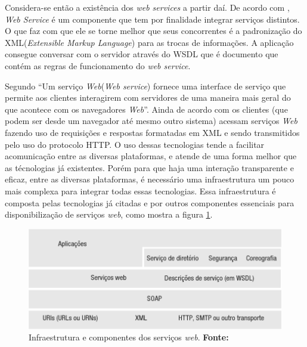 	\par Considera-se então a existência dos \textit{web services} a partir daí. De
acordo com , \textit{Web Service} é um componente que
tem por finalidade integrar serviços distintos. O que faz com que ele se torne
melhor que seus concorrentes é a padronização do XML(\textit{Extensible Markup
Language}) para as trocas de informações. A aplicação consegue conversar com o
servidor através do  WSDL que é documento que contém as regras de
funcionamento do \textit{web service}.
	
	\par Segundo  “Um serviço \textit{Web}(\textit{Web
service}) fornece uma interface de serviço que permite aos clientes interagirem
com servidores de uma maneira mais geral do que acontece com os navegadores
\textit{Web}”. Ainda de acordo com  os clientes (que
podem ser desde um navegador até mesmo outro sistema) acessam serviços 
\textit{Web} fazendo uso de requisições e respostas formatadas em XML e sendo
transmitidos pelo uso do protocolo HTTP. O uso dessas tecnologias tende a
facilitar acomunicação entre as diversas plataformas, e atende de uma forma
melhor que as técnologias já existentes. Porém para que haja uma interação
transparente e eficaz, entre as diversas plataformas, é necessário uma
infraestrutura um pouco mais complexa para integrar todas essas tecnologias.
Essa infraestrutura é composta pelas tecnologias já citadas e por outros
componentes essenciais para disponibilização de serviços \textit{web}, como
mostra a figura \ref{fig:exemplo2}.

\begin{figure}[h!]
	\centerline{\includegraphics[scale=0.8]{./imagens/imagem1.png}}
	\caption[Infraestrutura e componentes dos serviços
		\textit{web}. ]{Infraestrutura e componentes dos serviços
		\textit{web}. \textbf{Fonte:}}
	\label{fig:exemplo2}
\end{figure}
	
